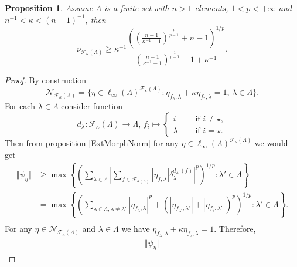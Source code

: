 \documentclass[12pt]{article}
\newtheorem{proposition}[theorem]{Proposition}
\begin{document}
\begin{proposition}\label{ExtMorphsNormLwrBnd}
    Assume $\Lambda$ is a finite set with $n>1$ elements, $1<p<+\infty$ 
    and $n^{-1}<\kappa<(n-1)^{-1}$, then
    \[
        \nu_{\mathcal{F}_{\kappa}(\Lambda)}
        \geq 
        \kappa^{-1}\frac{
            \left(
                \left(\frac{n-1}{\kappa^{-1}-1}\right)^{\frac{p}{p-1}}+n-1
            \right)^{1/p}
        }{
            \left(\frac{n-1}{\kappa^{-1}-1}\right)^{\frac{1}{p-1}}-1+\kappa^{-1}
        }.
    \]
\end{proposition}
\begin{proof}
    By construction
    \[
        \mathcal{N}_{\mathcal{F}_{\kappa}(\Lambda)}=\{
            \eta\in\ell_\infty(\Lambda)^{\mathcal{F}_{\kappa}(\Lambda)}:
            \eta_{f_\lambda,\lambda}+\kappa \eta_{f_*, \lambda}=1,\, 
            \lambda\in\Lambda
        \}.
    \]
    For each $\lambda\in\Lambda$ consider function
    \[
        d_\lambda:\mathcal{F}_\kappa(\Lambda)\to\Lambda,\,
        f_i\mapsto
        \begin{cases}
            i\quad &\mbox{ if }i\neq \star,\\
            \lambda\quad &\mbox{ if }i=\star.
        \end{cases}
    \]
    Then from proposition \ref{ExtMorphNorm} for 
    any $\eta\in\ell_\infty(\Lambda)^{\mathcal{F}_{\kappa}(\Lambda)}$ we would 
    get
    \[
    \begin{aligned}
        \Vert\psi_{\eta}\Vert
        &\geq\max\left\{
            \left(\sum_{\lambda\in\Lambda}
                \left|
                    \sum_{f\in\mathcal{F}_{\kappa(\Lambda)}} 
                        |\eta_{f,\lambda}|\delta_{\lambda}^{d_{\lambda'}(f)}
                \right|^p
            \right)^{1/p}:
            \lambda'\in\Lambda
        \right\} \\
        &=\max\left\{
            \left(
                \sum_{\lambda\in\Lambda,\lambda\neq \lambda'} 
                    |\eta_{f_\lambda,\lambda}|^p+
                    (|\eta_{f_{\lambda'},\lambda'}|+|\eta_{f_\star,\lambda'}|)^p
            \right)^{1/p}:
            \lambda'\in\Lambda
        \right\}. \\
    \end{aligned}
    \]
    For any $\eta\in\mathcal{N}_{\mathcal{F}_{\kappa}(\Lambda)}$ 
    and $\lambda\in\Lambda$ we 
    have $\eta_{f_\lambda,\lambda}+\kappa \eta_{f_\star, \lambda}=1$. 
    Therefore,
    \[
    \begin{aligned}
        \Vert \psi_{\eta}\Vert

\end{aligned}\]
\end{proof}
\end{document}

